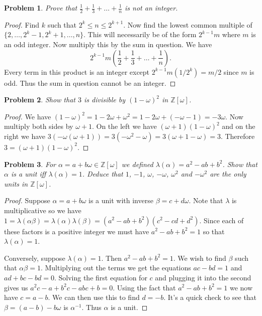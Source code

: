 \documentclass{article}
\newtheorem{problem}{Problem}
\begin{document}
\begin{problem}
Prove that $\frac{1}{2} + \frac{1}{3} + \dots + \frac{1}{n}$ is not an integer.
\end{problem}
\begin{proof}
Find $k$ such that $2^k \leq n \leq 2^{k+1}$. Now find the lowest common multiple of $\{2, \dots , 2^k-1, 2^k+1, \dots , n\}$. This will necessarily be of the form $2^{k-1} m$ where $m$ is an odd integer. Now multiply this by the sum in question. We have
\[
2^{k-1}m \left ( \frac{1}{2} + \frac{1}{3} + \dots + \frac{1}{n} \right ).
\]
Every term in this product is an integer except $2^{k-1}m (1/2^k) = m/2$ since $m$ is odd. Thus the sum in question cannot be an integer.
\end{proof}

\begin{problem}
Show that $3$ is divisible by $(1-\omega)^2$ in $\mathbb{Z}[\omega]$.
\end{problem}
\begin{proof}
We have $(1 - \omega)^2 = 1 - 2 \omega + \omega^2 = 1 - 2 \omega + (-\omega - 1) = -3 \omega$. Now multiply both sides by $\omega + 1$. On the left we have $(\omega + 1)(1 - \omega)^2$ and on the right we have $3(-\omega (\omega + 1)) = 3(-\omega^2 - \omega) = 3(\omega + 1 - \omega) = 3$. Therefore $3 = (\omega+1)(1-\omega)^2$.
\end{proof}

\begin{problem}
\label{unit}
For $\alpha = a + b\omega \in \mathbb{Z}[\omega]$ we defined $\lambda(\alpha) = a^2 - ab + b^2$. Show that $\alpha$ is a unit iff $\lambda(\alpha) = 1$. Deduce that $1$, $-1$, $\omega$, $-\omega$, $\omega^2$ and $-\omega^2$ are the only units in $\mathbb{Z}[\omega]$.
\end{problem}
\begin{proof}
Suppose $\alpha = a + b \omega$ is a unit with inverse $\beta = c + d \omega$. Note that $\lambda$ is multiplicative so we have $1 = \lambda(\alpha \beta) = \lambda (\alpha) \lambda (\beta) = (a^2-ab+b^2) (c^2-cd+d^2)$. Since each of these factors is a positive integer we must have $a^2-ab+b^2 = 1$ so that $\lambda (\alpha) = 1$.

Conversely, suppose $\lambda (\alpha) = 1$. Then $a^2 - ab + b^2 = 1$. We wish to find $\beta$ such that $\alpha\beta = 1$. Multiplying out the terms we get the equations $ac-bd = 1$ and $ad + bc - bd = 0$. Solving the first equation for $c$ and plugging it into the second gives us $a^2c - a + b^2c - abc + b = 0$. Using the fact that $a^2 - ab + b^2 = 1$ we now have $c = a-b$. We can then use this to find $d = -b$. It's a quick check to see that $\beta = (a-b) - b \omega$ is $\alpha^{-1}$. Thus $\alpha$ is a unit.
\end{proof}
\end{document}
